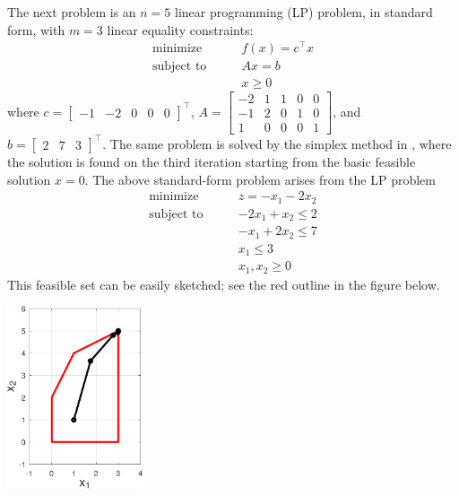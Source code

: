 \documentclass[11pt]{article}
\newcommand{\ds}{\displaystyle}
\begin{document}
The next problem is an $n=5$ linear programming (LP) problem, in standard form, with $m=3$ linear equality constraints:
\begin{equation}
\begin{matrix}
\text{minimize} \qquad & f(x) = c^\top x \\
\text{subject to} \qquad & A x = b \\
 & x \ge 0
\end{matrix} \label{eq:linearproblem}
\end{equation}
where $\ds c = \begin{bmatrix} -1 & -2 & 0 & 0 & 0 \end{bmatrix}^\top$, $\ds A = \begin{bmatrix} -2 & 1 & 1 & 0 & 0 \\ -1 & 2 & 0 & 1 & 0 \\ 1 & 0 & 0 & 0 & 1 \end{bmatrix}$, and $\ds b = \begin{bmatrix} 2 & 7 & 3 \end{bmatrix}^\top$.  The same problem is solved by the simplex method in \cite[section 5.2]{GrivaNashSofer2009}, where the solution is found on the third iteration starting from the basic feasible solution $x=0$.  The above standard-form problem arises from the LP problem
\begin{equation}
\begin{matrix}
\text{minimize} \qquad & z = -x_1 - 2x_2 \\
\text{subject to} \qquad & -2x_1 + x_2 \le 2 \\
 & -x_1 + 2x_2 \le 7 \\
 & x_1 \le 3 \\
 & x_1, x_2 \ge 0
\end{matrix} \label{eq:twodlp}
\end{equation}
This feasible set can be easily sketched; see the red outline in the figure below.

\medskip
\begin{center}
\includegraphics[width=0.3\textwidth]{figs/linear.pdf}
\end{center}
\end{document}

